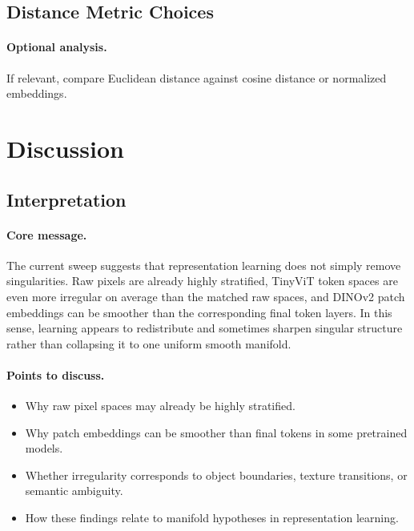 \documentclass{article}
\theoremstyle{definition}
\theoremstyle{plain}
\theoremstyle{remark}
\begin{document}
\subsection{Distance Metric Choices}
\paragraph{Optional analysis.}
If relevant, compare Euclidean distance against cosine distance or normalized embeddings.

\section{Discussion}
\label{sec:discussion}

\subsection{Interpretation}
\paragraph{Core message.}
The current sweep suggests that representation learning does not simply remove singularities. Raw pixels are already highly stratified, TinyViT token spaces are even more irregular on average than the matched raw spaces, and DINOv2 patch embeddings can be smoother than the corresponding final token layers. In this sense, learning appears to redistribute and sometimes sharpen singular structure rather than collapsing it to one uniform smooth manifold.

\paragraph{Points to discuss.}
\begin{itemize}[leftmargin=1.5em]
\item Why raw pixel spaces may already be highly stratified.
\item Why patch embeddings can be smoother than final tokens in some pretrained models.
\item Whether irregularity corresponds to object boundaries, texture transitions, or semantic ambiguity.
\item How these findings relate to manifold hypotheses in representation learning.
\end{itemize}
\end{document}
